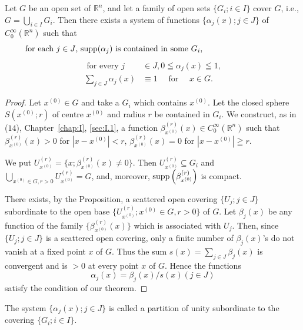 \begin{theoremn} Let $G$ be an open set of $\mathbb{R}^{n}$, and let a family of open sets $\{G_i; i \in I\}$ cover $G$, i.e., $G = \bigcup\limits_{i \in I} G_i$. Then there exists a system of functions $\{\alpha_j(x); j \in J\}$ of $C_0^\infty(\mathbb{R}^{n})$ such that
\begin{equation}\label{eq:I.12.3}
\parbox{0.90\linewidth}{for each $j \in J$, $\supp (\alpha_j)$ is contained in some $G_i$,}
\end{equation}
\begin{align}
\text{ for every } j& \in J, 0 \leqq \alpha_{j} (x) \leqq 1, \label{eq:I.12.4} \\
\sum\limits_{j \in J} \alpha_{j} (x)& \equiv 1 \quad \text{ for } \quad x \in G. \label{eq:I.12.5}
\end{align}

\end{theoremn}
\begin{proof}
 Let $x^{(0)} \in G$ and take a $G_i$ which contains $x^{(0)}$. Let the closed sphere $S(x^{(0)}; r)$ of centre $x^{(0)}$ and radius $r$ be contained in $G_i$. We construct, as in ($14$), Chapter~\ref{chap:I}, \ref{sec:I.1}, a function $\beta_{x^{(0)}}^{(r)}(x) \in C_0^\infty(\mathbb{R}^{n})$ such that $\beta_{x^{(0)}}^{(r)}(x) > 0$ for $|x- x^{(0)}| < r$, $\beta_{x^{(0)}}^{(r)}(x) = 0$ for $|x- x^{(0)}| \geqq r$. 


We put $U_{x^{(0)}}^{(r)} = \{x; \beta_{x^{(0)}}^{(r)}(x) \neq 0\}$. Then $U_{x^{(0)}}^{(r)} \subseteq G_i$ and $\bigcup\limits_{x^{(0)} \in G, r > 0} U_{x^{(0)}}^{(r)} = G$, and, moreover, $\operatorname{supp}\left(\beta_{x^{(0)}}^{(r)}\right)$ is compact. 

There exists, by the Proposition, a scattered open covering $\{U_j; j \in J\}$ subordinate to the open base $\{U_{x^{(0)}}^{(r)}; x^{(0)} \in G, r > 0\}$ of $G$. Let $\beta_j(x)$ be any function of the family $\{\beta_{x^{(0)}}^{(r)}(x)\}$ which is associated with $U_j$. Then, since $\{U_j; j \in J\}$ is a scattered open covering, only a finite number of $\beta_j(x)$'s do not vanish at a fixed point $x$ of $G$. Thus the sum $s(x) = \sum\limits_{j \in J} \beta_j(x)$ is convergent and is $>0$ at every point $x$ of $G$. Hence the functions 
\[
\alpha_{j} (x) = \beta_{j} (x) / s (x) (j \in J)
\]
satisfy the condition of our theorem.
\end{proof}

\begin{definition}\label{def:I.12.Definition.2} The system $\{\alpha_j(x); j \in J\}$ is called a partition of unity subordinate to the covering $\{G_i; i \in I\}$. 
\end{definition}



